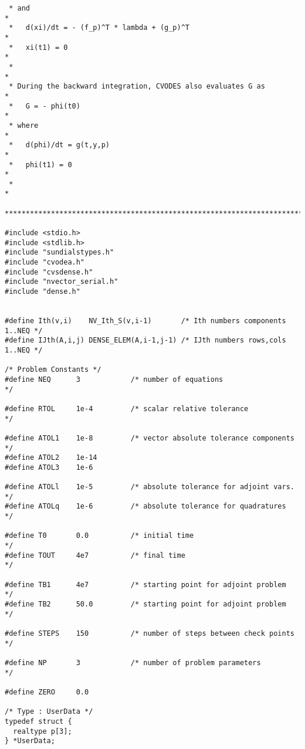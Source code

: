 \begin{verbatim}
 * and                                                                  *
 *   d(xi)/dt = - (f_p)^T * lambda + (g_p)^T                            *
 *   xi(t1) = 0                                                         *
 *                                                                      *
 * During the backward integration, CVODES also evaluates G as          *
 *   G = - phi(t0)                                                      *
 * where                                                                *
 *   d(phi)/dt = g(t,y,p)                                               *
 *   phi(t1) = 0                                                        *
 *                                                                      *
 ************************************************************************/

#include <stdio.h>
#include <stdlib.h>
#include "sundialstypes.h"
#include "cvodea.h"
#include "cvsdense.h"
#include "nvector_serial.h"
#include "dense.h"


#define Ith(v,i)    NV_Ith_S(v,i-1)       /* Ith numbers components 1..NEQ */
#define IJth(A,i,j) DENSE_ELEM(A,i-1,j-1) /* IJth numbers rows,cols 1..NEQ */

/* Problem Constants */
#define NEQ      3            /* number of equations                  */

#define RTOL     1e-4         /* scalar relative tolerance            */

#define ATOL1    1e-8         /* vector absolute tolerance components */
#define ATOL2    1e-14
#define ATOL3    1e-6

#define ATOLl    1e-5         /* absolute tolerance for adjoint vars. */
#define ATOLq    1e-6         /* absolute tolerance for quadratures   */

#define T0       0.0          /* initial time                         */
#define TOUT     4e7          /* final time                           */

#define TB1      4e7          /* starting point for adjoint problem   */
#define TB2      50.0         /* starting point for adjoint problem   */

#define STEPS    150          /* number of steps between check points */

#define NP       3            /* number of problem parameters         */

#define ZERO     0.0

/* Type : UserData */
typedef struct {
  realtype p[3];
} *UserData;


\end{verbatim}
